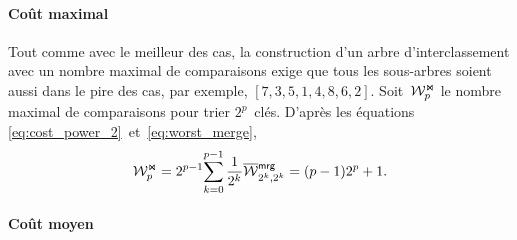 \paragraph{Coût maximal}

Tout comme avec le meilleur des cas, la construction d'un arbre
d'interclassement avec un nombre maximal de comparaisons exige que
tous les sous-arbres soient aussi dans le pire des cas, par exemple,
\([7,3,5,1,4,8,6,2]\). Soit~\(\mathcal{W}_{p}^{\Join}\) le nombre maximal de
comparaisons pour trier \(2^p\)~clés. D'après les équations
\eqref{eq:cost_power_2}~et~\eqref{eq:worst_merge},
\begin{equation}
\W{\Join}{p}
  = 2^{p-1}\!\sum_{k=0}^{p-1}{\frac{1}{2^k}\OW{\fun{mrg}}{2^k,2^k}}
  = (p-1)2^p + 1.
\label{eq:worst_power}\index{mrg@$\W{\Join}{n}$}
\end{equation}

\paragraph{Coût moyen}
\label{par:Atms_2p}

